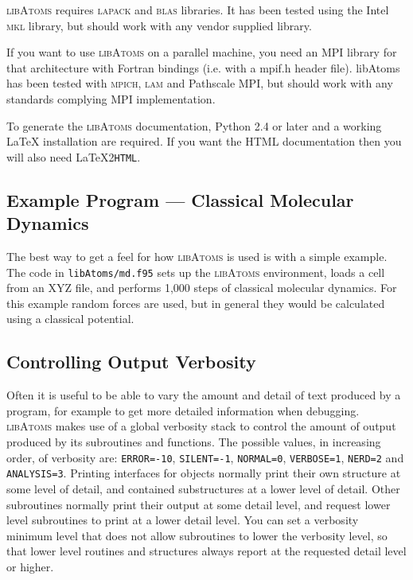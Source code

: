 \textsc{libAtoms} requires \textsc{lapack} and \textsc{blas}
libraries. It has been tested using the Intel \textsc{mkl} library,
but should work with any vendor supplied library.

If you want to use \textsc{libAtoms} on a parallel machine, you need
an MPI library for that architecture with Fortran bindings (i.e. with
a mpif.h header file). libAtoms has been tested with \textsc{mpich},
\textsc{lam} and Pathscale MPI, but should work with any standards complying
MPI implementation.

To generate the \textsc{libAtoms} documentation, Python 2.4 or later
 and a working \LaTeX{} installation are required. If you want the HTML
documentation then you will also need \LaTeX 2\texttt{HTML}.

\newpage

\subsection*{Example Program --- Classical Molecular Dynamics}

The best way to get a feel for how \textsc{libAtoms} is used
is with a simple example. The code in \texttt{libAtoms/md.f95} sets up
the \textsc{libAtoms} environment, loads a cell from
an XYZ file, and performs 1,000 steps of classical molecular
dynamics. For this example random forces are used, but in general
they would be calculated using a classical potential.

\subsection*{Controlling Output Verbosity}

Often it is useful to be able to vary the amount and detail of text
produced by a program, for example to get more detailed information
when debugging. \textsc{libAtoms} makes use of a global verbosity
stack to control the amount of output produced by its subroutines and
functions. The possible values, in increasing order, of verbosity are:
\texttt{ERROR=-10}, \texttt{SILENT=-1}, \texttt{NORMAL=0},
\texttt{VERBOSE=1}, \texttt{NERD=2} and \texttt{ANALYSIS=3}.  Printing
interfaces for objects normally print their own structure at some 
level of detail, and contained substructures at a lower level of detail.  
Other subroutines normally print their output at some detail level, and
request lower level subroutines to print at a lower detail level.
You can set a verbosity minimum level that does not allow subroutines
to lower the verbosity level, so that lower level routines and structures
always report at the requested detail level or higher.

